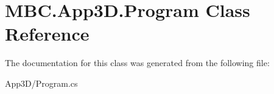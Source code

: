 \hypertarget{class_m_b_c_1_1_app3_d_1_1_program}{\section{M\-B\-C.\-App3\-D.\-Program Class Reference}
\label{class_m_b_c_1_1_app3_d_1_1_program}
}


The documentation for this class was generated from the following file\-:\begin{DoxyCompactItemize}
\item 
App3\-D/Program.\-cs\end{DoxyCompactItemize}

